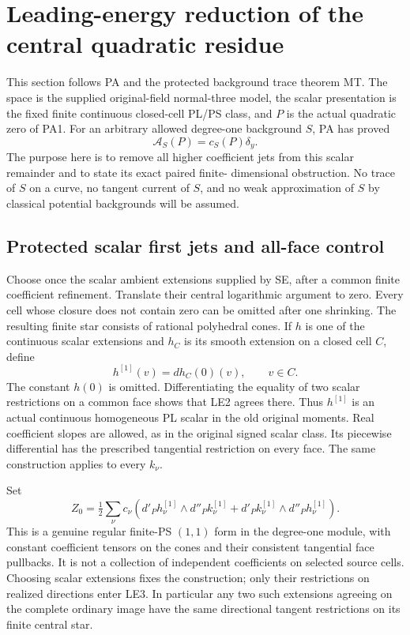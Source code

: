 \section{Leading-energy reduction of the central quadratic residue}
\label{sec:r13-leading-energy-residual}

This section follows PA and the protected background trace theorem
MT.  The space is the supplied original-field normal-three model,
the scalar presentation is the fixed finite continuous closed-cell
PL/PS class, and $P$ is the actual quadratic zero of PA1.  For an
arbitrary allowed degree-one background $S$, PA has proved
\[
                     \mathcal A_S(P)=c_S(P)\delta_y.
 \tag{LE1}
\]
The purpose here is to remove all higher coefficient jets from
this scalar remainder and to state its exact paired finite-
dimensional obstruction.  No trace of $S$ on a curve, no tangent
current of $S$, and no weak approximation of $S$ by classical
potential backgrounds will be assumed.

\subsection{Protected scalar first jets and all-face control}

Choose once the scalar ambient extensions supplied by SE, after
a common finite coefficient refinement.  Translate their central
logarithmic argument to zero.  Every cell whose closure does not
contain zero can be omitted after one shrinking.  The resulting
finite star consists of rational polyhedral cones.  If $h$ is
one of the continuous scalar extensions and $h_C$ is its smooth
extension on a closed cell $C$, define
\[
                 h^{[1]}(v)=d h_C(0)(v),\qquad v\in C.
 \tag{LE2}
\]
The constant $h(0)$ is omitted.  Differentiating the equality of
two scalar restrictions on a common face shows that LE2 agrees
there.  Thus $h^{[1]}$ is an actual continuous homogeneous PL
scalar in the old original moments.  Real coefficient slopes
are allowed, as in the original signed scalar class.  Its
piecewise differential has the prescribed tangential restriction
on every face.  The same construction applies to every $k_\nu$.

Set
\[
 Z_0=\tfrac12\sum_\nu c_\nu
   \left(d'_P h_\nu^{[1]}\wedge d''_P k_\nu^{[1]}
       +d'_P k_\nu^{[1]}\wedge d''_P h_\nu^{[1]}\right).
 \tag{LE3}
\]
This is a genuine regular finite-PS $(1,1)$ form in the
degree-one module, with constant coefficient tensors on the
cones and their consistent tangential face pullbacks.  It is
not a collection of independent coefficients on selected source
cells.  Choosing scalar extensions fixes the construction; only
their restrictions on realized directions enter LE3.  In
particular any two such extensions agreeing on the complete
ordinary image have the same directional tangent restrictions
on its finite central star.

